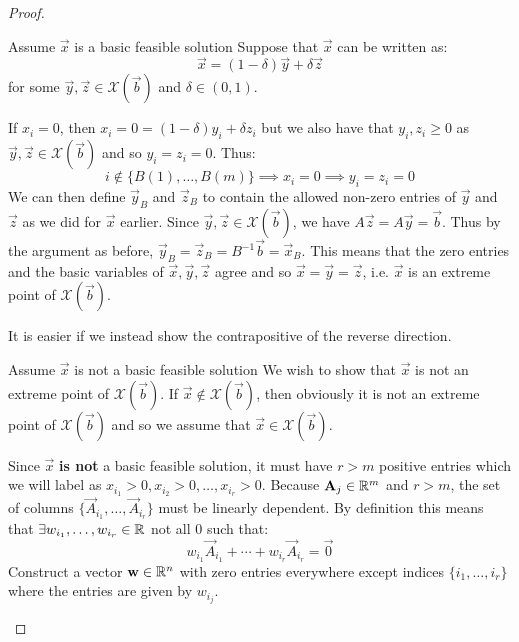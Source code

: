 \documentclass[../main.tex]{subfiles}
\begin{document}
\begin{proof}
  \begin{proofdirection}{Assume $\vec{x}$ is a basic feasible solution}
    Suppose that $\vec{x}$ can be written as:
    \[
      \vec{x} = (1 - \delta)\vec{y} + \delta \vec{z}
    \]
    for some $\vec{y}, \vec{z} \in \mathcal{X}(\vec{b})$ and $\delta \in (0, 1)$.

    If $x_i = 0$, then $x_i = 0 = (1 - \delta)y_i + \delta z_i$ but we also have that $y_i, z_i \geq 0$ as $\vec{y}, \vec{z} \in \mathcal{X}(\vec{b})$ and so $y_i = z_i = 0$.
    Thus:
    \[
      i \notin \{B(1), \ldots, B(m)\} \implies x_i = 0 \implies y_i = z_i = 0
    \]
    We can then define $\vec{y}_B$ and $\vec{z}_B$ to contain the allowed non-zero entries of $\vec{y}$ and $\vec{z}$ as we did for $\vec{x}$ earlier.
    Since $\vec{y}, \vec{z} \in \mathcal{X}(\vec{b})$, we have $A\vec{z} = A\vec{y} = \vec{b}$.
    Thus by the argument as before, $\vec{y}_B = \vec{z}_B = B^{-1} \vec{b} = \vec{x}_B$.
    This means that the zero entries and the basic variables of $\vec{x}, \vec{y}, \vec{z}$ agree and so $\vec{x} = \vec{y} = \vec{z}$, i.e. $\vec{x}$ is an extreme point of $\mathcal{X}(\vec{b})$.
  \end{proofdirection}
  It is easier if we instead show the contrapositive of the reverse direction.
  \begin{proofdirection}{Assume $\vec{x}$ is not a basic feasible solution}
    We wish to show that $\vec{x}$ is not an extreme point of $\mathcal{X}(\vec{b})$.
    If $\vec{x} \notin \mathcal{X}(\vec{b})$, then obviously it is not an extreme point  of $\mathcal{X}(\vec{b})$ and so we assume that $\vec{x} \in \mathcal{X}(\vec{b})$.

    Since $\vec{x}$ \textbf{is not} a basic feasible solution, it must have $r > m$ positive entries which we will label as $x_{i_1} > 0, x_{i_2} > 0, \ldots, x_{i_r} > 0$.
    Because $\mathbf{\bm{A}}_j \in \mathbb{R}^{m}$ and $r > m$, the set of columns $\{\vec{A}_{i_1}, \ldots, \vec{A}_{i_r}\}$ must be linearly dependent.
    By definition this means that $\exists w_{i_1}, \ldots, w_{i_r} \in \mathbb{R}$ not all 0 such that:
    \[
      w_{i_1} \vec{A}_{i_1} + \cdots + w_{i_r} \vec{A}_{i_r} = \vec{0}
    \]
    Construct a vector $\mathbf{\bm{w}} \in \mathbb{R}^{n}$ with zero entries everywhere except indices $\{i_1, \ldots, i_r\}$ where the entries are given by $w_{i_j}$.


\end{proofdirection}
\end{proof}
\end{document}
